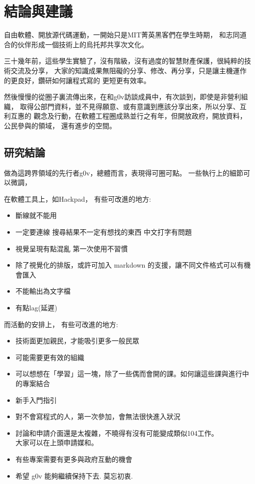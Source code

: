 \chapter{結論與建議}
自由軟體、開放源代碼運動，一開始只是MIT菁英黑客們在學生時期，
和志同道合的伙伴形成一個技術上的烏托邦共享次文化。

三十幾年前，這些學生實驗了，沒有階級，沒有過度的智慧財產保護，很純粹的技術交流及分享，
大家的知識成果無阻礙的分享、修改、再分享，只是讓主機運作的更良好，鑽研如何讓程式寫的
更短更有效率。

然後慢慢的從圈子裏流傳出來，在和g0v訪談成員中，有次談到，即使是非營利組織，
取得公部門資料，並不見得願意、或有意識到應該分享出來，所以分享、互利互惠的
觀念及行動，在軟體工程圈成熟並行之有年，但開放政府，開放資料，公民參與的領域，
還有進步的空間。



\section{研究結論}
做為這跨界領域的先行者g0v，總體而言，表現得可圈可點。
一些執行上的細節可以微調，

在軟體工具上，如Hackpad，
有些可改進的地方:
\begin{itemize}
\item 斷線就不能用
\item 一定要連線 搜尋結果不一定有想找的東西 中文打字有問題
\item 視覺呈現有點混亂 第一次使用不習慣
\item 除了視覺化的排版，或許可加入 markdown 的支援，讓不同文件格式可以有機會匯入
\item 不能輸出為文字檔
\item 有點lag(延遲)
\end{itemize}

而活動的安排上，
有些可改進的地方:
\begin{itemize}
\item 技術面更加親民，才能吸引更多一般民眾
\item 可能需要更有效的組織
\item 可以想想在「學習」這一塊，除了一些偶而會開的課。如何讓這些課與進行中的專案結合
\item 新手入門指引
\item 對不會寫程式的人，第一次參加，會無法很快進入狀況
\item 討論和申請介面還是太複雜，不曉得有沒有可能變成類似104工作。\\ 大家可以在上頭申請媒和。
\item 有些專案需要有更多與政府互動的機會
\item 希望 g0v 能夠繼續保持下去. 莫忘初衷.

\end{itemize}

